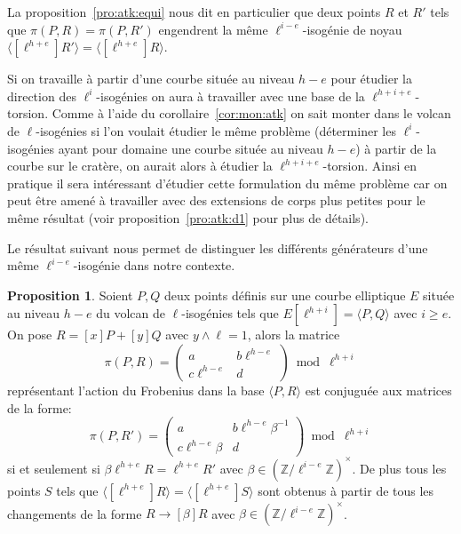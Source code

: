 \documentclass[10pt,a4paper]{book}
\theoremstyle{plain}
\theoremstyle{definition}
\theoremstyle{definition}
\theoremstyle{definition}
\newtheorem{prop}[thm]{Proposition}
\theoremstyle{definition}
\theoremstyle{remark}
\newtheorem{rem}[thm]{Remarque}
\theoremstyle{remark}
\theoremstyle{definition}
\begin{document}
La proposition~\ref{pro:atk:equi} nous dit en particulier que 
deux points $R$ et $R'$ tels que $\pi(P,R)=\pi(P,R')$ engendrent la même 
$\ell^{i-e}$-isogénie de noyau $\langle [\ell^{h+e}]R' \rangle = \langle 
[\ell^{h+e}]R \rangle$.

 

Si on travaille à partir d'une courbe située au niveau $h-e$ pour 
étudier la direction des $\ell^i$-isogénies on aura à travailler
avec une base de la $\ell^{h+i+e}$-torsion. Comme à l'aide du 
corollaire~\ref{cor:mon:atk} on sait monter dans le volcan de 
$\ell$-isogénies si l'on voulait étudier le même 
problème (déterminer les $\ell^{i}$-isogénies ayant pour domaine une courbe 
située au niveau $h-e$) à partir de la courbe sur le cratère, on aurait alors 
à étudier la $\ell^{h+i+e}$-torsion. Ainsi en pratique il sera intéressant 
d'étudier cette formulation du même problème car on peut être amené à 
travailler avec des extensions de corps plus petites pour le même résultat 
(voir proposition~\ref{pro:atk:d1} pour plus de détails).


Le résultat suivant nous permet de distinguer les 
différents générateurs d'une même $\ell^{i-e}$-isogénie dans notre contexte.

\begin{prop}
\label{pro:cla:fro:mat}
Soient $P,Q$ deux points définis sur une courbe elliptique $E$ située au niveau
$h-e$ du volcan de $\ell$-isogénies tels que 
$E[\ell^{h+i}]=\langle P,Q \rangle$ avec $i \geqslant e$. On pose $R=[x]P+[y]Q$ avec $y\wedge 
\ell=1$, alors la matrice 
\[
\pi(P,R)=\left ( \begin{matrix}a & b\ell^{h-e} \\ c\ell^{h-e} & d
\end{matrix}\right ) \bmod \ell^{h+i}
\] représentant l'action du Frobenius dans la base $\langle P,R \rangle$ est
conjuguée aux matrices de la forme:
\[
\pi(P,R')=\left ( \begin{matrix}a & b\ell^{h-e}\beta^{-1} \\ c\ell^{h-e}\beta & d
\end{matrix}\right ) \bmod \ell^{h+i}
\]
si et seulement si $\beta \ell^{h+e}R= \ell^{h+e}R'$ avec $\beta \in \left( \mathbb{Z}/\ell^{i-e} \mathbb{Z} 
\right)^{\times}$. De plus tous les points $S$ tels que $\langle [\ell^{h+e}]R \rangle = \langle [\ell^{h+e}]S \rangle$ sont obtenus à partir de tous les changements de la forme 
$R\rightarrow [\beta]R$ avec $\beta \in \left( \mathbb{Z}/\ell^{i-e}\mathbb{Z} 
\right)^{\times}$.
\end{prop}
\end{document}
